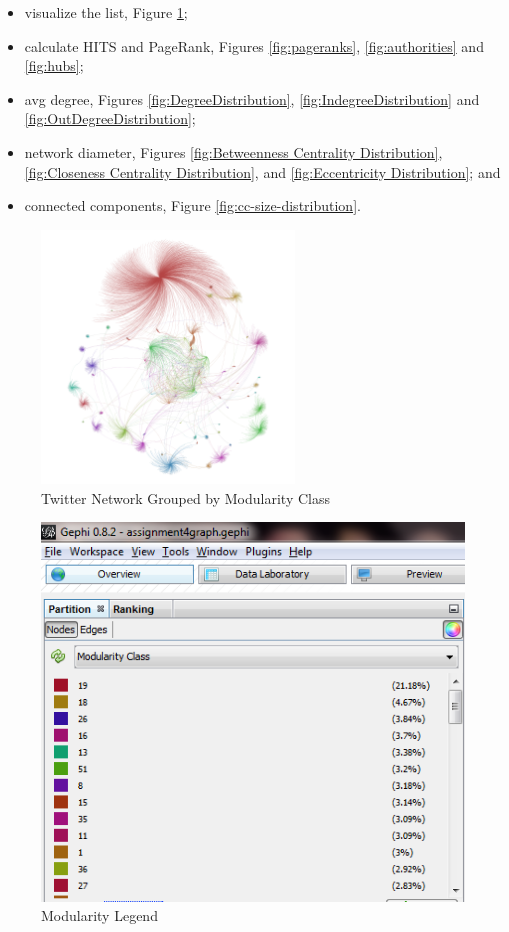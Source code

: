 \documentclass[letterpaper,11pt]{report}
\begin{document}
\begin{savenotes}
\begin{itemize}
	\item visualize the list, Figure \ref{fig:ModularityClassGraph};
	\item calculate HITS and PageRank, Figures \ref{fig:pageranks}, \ref{fig:authorities} and \ref{fig:hubs};
	\item avg degree, Figures \ref{fig:DegreeDistribution}, \ref{fig:IndegreeDistribution} and \ref{fig:OutDegreeDistribution};
	\item network diameter, Figures \ref{fig:Betweenness Centrality Distribution}, \ref{fig:Closeness Centrality Distribution}, and \ref{fig:Eccentricity Distribution}; and
	\item connected components, Figure \ref{fig:cc-size-distribution}.
\end{itemize}

\begin{figure}[htbp]
	\centering
		\includegraphics[width=0.60\textwidth]{ModularityClassGraph.png}
	\caption{Twitter Network Grouped by Modularity Class}
	\label{fig:ModularityClassGraph}
\end{figure}

\begin{figure}[htbp]
	\centering
		\includegraphics{ModularityLegend.png}
	\caption{Modularity Legend}
	\label{fig:ModularityLegend}
\end{figure}


\end{savenotes}
\end{document}
